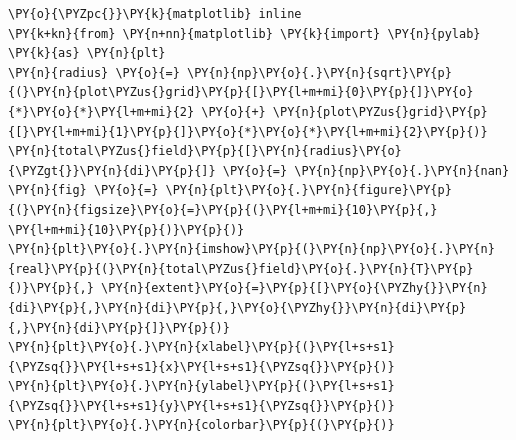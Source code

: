 \begin{tcolorbox}
\begin{Verbatim}[commandchars=\\\{\}]
\PY{o}{\PYZpc{}}\PY{k}{matplotlib} inline
\PY{k+kn}{from} \PY{n+nn}{matplotlib} \PY{k}{import} \PY{n}{pylab} \PY{k}{as} \PY{n}{plt}
\PY{n}{radius} \PY{o}{=} \PY{n}{np}\PY{o}{.}\PY{n}{sqrt}\PY{p}{(}\PY{n}{plot\PYZus{}grid}\PY{p}{[}\PY{l+m+mi}{0}\PY{p}{]}\PY{o}{*}\PY{o}{*}\PY{l+m+mi}{2} \PY{o}{+} \PY{n}{plot\PYZus{}grid}\PY{p}{[}\PY{l+m+mi}{1}\PY{p}{]}\PY{o}{*}\PY{o}{*}\PY{l+m+mi}{2}\PY{p}{)}
\PY{n}{total\PYZus{}field}\PY{p}{[}\PY{n}{radius}\PY{o}{\PYZgt{}}\PY{n}{di}\PY{p}{]} \PY{o}{=} \PY{n}{np}\PY{o}{.}\PY{n}{nan}
\PY{n}{fig} \PY{o}{=} \PY{n}{plt}\PY{o}{.}\PY{n}{figure}\PY{p}{(}\PY{n}{figsize}\PY{o}{=}\PY{p}{(}\PY{l+m+mi}{10}\PY{p}{,} \PY{l+m+mi}{10}\PY{p}{)}\PY{p}{)}
\PY{n}{plt}\PY{o}{.}\PY{n}{imshow}\PY{p}{(}\PY{n}{np}\PY{o}{.}\PY{n}{real}\PY{p}{(}\PY{n}{total\PYZus{}field}\PY{o}{.}\PY{n}{T}\PY{p}{)}\PY{p}{,} \PY{n}{extent}\PY{o}{=}\PY{p}{[}\PY{o}{\PYZhy{}}\PY{n}{di}\PY{p}{,}\PY{n}{di}\PY{p}{,}\PY{o}{\PYZhy{}}\PY{n}{di}\PY{p}{,}\PY{n}{di}\PY{p}{]}\PY{p}{)}
\PY{n}{plt}\PY{o}{.}\PY{n}{xlabel}\PY{p}{(}\PY{l+s+s1}{\PYZsq{}}\PY{l+s+s1}{x}\PY{l+s+s1}{\PYZsq{}}\PY{p}{)}
\PY{n}{plt}\PY{o}{.}\PY{n}{ylabel}\PY{p}{(}\PY{l+s+s1}{\PYZsq{}}\PY{l+s+s1}{y}\PY{l+s+s1}{\PYZsq{}}\PY{p}{)}
\PY{n}{plt}\PY{o}{.}\PY{n}{colorbar}\PY{p}{(}\PY{p}{)}
\end{Verbatim}
\end{tcolorbox}
